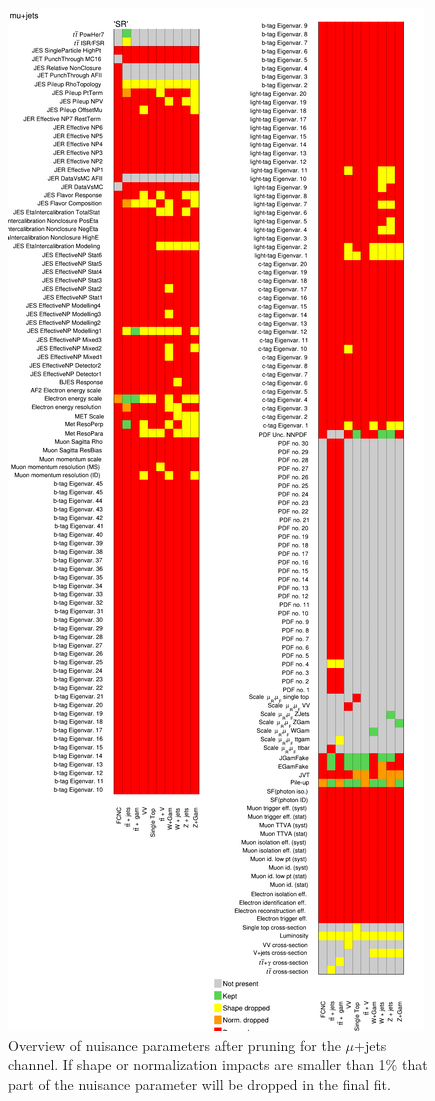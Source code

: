 \begin{figure}[h!]
	\centering
	\includegraphics[width=.5\columnwidth]{../ThesisImages/RegionPlots/FinalRegions/Systematics/MQGamEJetPHptMJet/FCNC_All_mujets/Pruning.png}
	\caption[Nuisance parameters after pruning for $\mu$+jets channel]{Overview of nuisance parameters after pruning for the $\mu$+jets channel.  If shape or normalization impacts are smaller than 1\% that part of the nuisance parameter will be dropped in the final fit. }
	\label{fig:Pruningmujets}
\end{figure}

